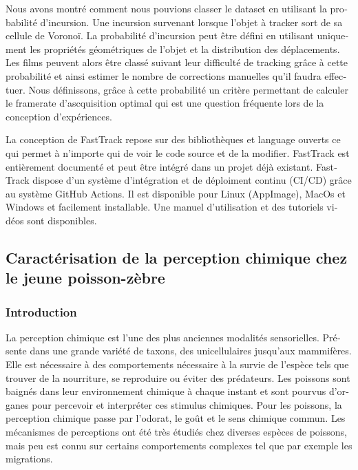 \begin{otherlanguage}{french}
Nous avons montré comment nous pouvions classer le dataset en utilisant la probabilité d'incursion. Une incursion survenant lorsque l'objet à tracker sort de sa cellule de Voronoï. La probabilité d'incursion peut être défini en utilisant uniquement les propriétés géométriques de l'objet et la distribution des déplacements. Les films peuvent alors être classé suivant leur difficulté de tracking grâce à cette probabilité et ainsi estimer le nombre de corrections manuelles qu'il faudra effectuer. Nous définissons, grâce à cette probabilité un critère permettant de calculer le framerate d'ascquisition optimal qui est une question fréquente lors de la conception d'expériences.

La conception de FastTrack repose sur des bibliothèques et language ouverts ce qui permet à n'importe qui de voir le code source et de la modifier. FastTrack est entièrement documenté et peut être intégré dans un projet déjà existant. FastTrack dispose d'un système d'intégration et de déploiment continu (CI/CD) grâce au système GitHub Actions. Il est disponible pour Linux (AppImage), MacOs et Windows et facilement installable. Une manuel d'utilisation et des tutoriels vidéos sont disponibles.


\subsection*{Caractérisation de la perception chimique chez le jeune poisson-zèbre}

\subsubsection*{Introduction}
La perception chimique est l'une des plus anciennes modalités sensorielles. Présente dans une grande variété de taxons, des unicellulaires jusqu'aux mammifères. Elle est nécessaire à des comportements nécessaire à la survie de l'espèce tels que trouver de la nourriture, se reproduire ou éviter des prédateurs. Les poissons sont baignés dans leur environnement chimique à chaque instant et sont pourvus d'organes pour percevoir et interpréter ces stimulus chimiques. Pour les poissons, la perception chimique passe par l'odorat, le goût et le sens chimique commun. Les mécanismes de perceptions ont été très étudiés chez diverses espèces de poissons, mais peu est connu sur certains comportements complexes tel que par exemple les migrations.


\end{otherlanguage}
